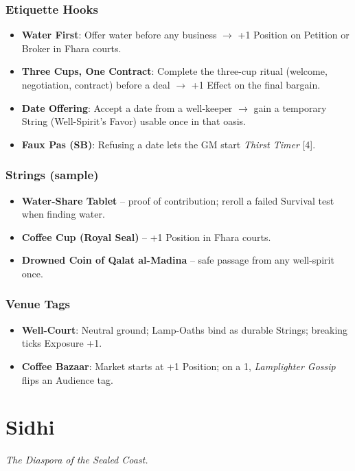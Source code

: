 \documentclass[12pt,oneside]{book}
\begin{document}
\subsection*{Etiquette Hooks}
\begin{itemize}
  \item \textbf{Water First}: Offer water before any business $\rightarrow$ +1 Position on Petition or Broker in Fhara courts.
  \item \textbf{Three Cups, One Contract}: Complete the three-cup ritual (welcome, negotiation, contract) before a deal $\rightarrow$ +1 Effect on the final bargain.
  \item \textbf{Date Offering}: Accept a date from a well-keeper $\rightarrow$ gain a temporary String (Well-Spirit's Favor) usable once in that oasis.
  \item \textbf{Faux Pas (SB)}: Refusing a date lets the GM start \textit{Thirst Timer } [4].
\end{itemize}

\subsection*{Strings (sample)}
\begin{itemize}
  \item \textbf{Water-Share Tablet} -- proof of contribution; reroll a failed Survival test when finding water.
  \item \textbf{Coffee Cup (Royal Seal)} -- +1 Position in Fhara courts.
  \item \textbf{Drowned Coin of Qalat al-Madina} -- safe passage from any well-spirit once.
\end{itemize}

\subsection*{Venue Tags}
\begin{itemize}
  \item \textbf{Well-Court}: Neutral ground; Lamp-Oaths bind as durable Strings; breaking ticks Exposure +1.
  \item \textbf{Coffee Bazaar}: Market starts at +1 Position; on a 1, \textit{Lamplighter Gossip} flips an Audience tag.
\end{itemize}

\newpage

\newpage

\chapter{Sidhi}
\emph{The Diaspora of the Sealed Coast.}
\end{document}
